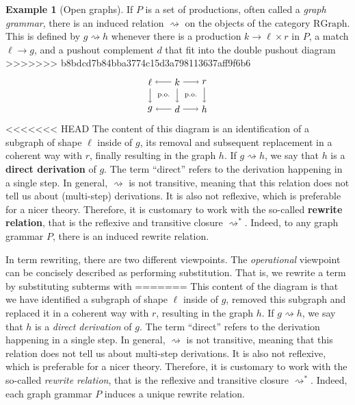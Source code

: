 \documentclass{amsart}
\newcommand{\RGraph}{\cat{RGraph}}
\newcommand{\defn}[1]{\textbf{#1}}
\newcommand{\cat}[1]{\mathrm{#1}}
\newcommand{\dderiv}[2]{#1 \rightsquigarrow #2}
\newcommand{\deriv}[2]{#1 \rightsquigarrow^\ast #2}
\newcommand{\squigto}{\rightsquigarrow}
\theoremstyle{remark}
\theoremstyle{definition}
\newtheorem{example}[theorem]{Example}
\begin{document}
\begin{example}[Open graphs]
If $ P $ is a set of productions, often called a \emph{graph grammar},
there is an induced relation $ \squigto $ on the objects of the category
$ \RGraph $. This is defined by $ g \squigto h $ whenever there is a
production $ k \to \ell \times r $ in $ P $, a match $ \ell \to g $,
and a pushout complement $ d $ that fit into the double pushout
diagram
>>>>>>> b8bdcd7b84bba3774c15d3a798113637aff9f6b6
%
\[
  \begin{tikzpicture}
    \node (1) at (0,1) {$ \ell $};
    \node (2) at (1,1) {$ k $};
    \node (3) at (2,1) {$ r $};
    \node (4) at (0,0) {$ g $};
    \node (5) at (1,0) {$ d $};
    \node (6) at (2,0) {$ h $};
    \draw [->] (2) to node [] {\scriptsize{$  $}} (1);
    \draw [->] (2) to node [] {\scriptsize{$  $}} (3);
    \draw [->] (5) to node [] {\scriptsize{$  $}} (4);
    \draw [->] (5) to node [] {\scriptsize{$  $}} (6);
    \draw [->] (1) to node [] {\scriptsize{$  $}} (4);
    \draw [->] (2) to node [] {\scriptsize{$  $}} (5);
    \draw [->] (3) to node [] {\scriptsize{$  $}} (6);
    \node () at (0.5,0.5) {\scriptsize{p.o.}};
    \node () at (1.5,0.5) {\scriptsize{p.o.}};
  \end{tikzpicture}
\]
%
<<<<<<< HEAD
The content of this diagram is an identification of a subgraph of
shape $ \ell $ inside of $ g $, its removal and subsequent replacement
in a coherent way with $ r $, finally resulting in the graph $ h $. If
$ \dderiv{g}{h} $, we say that $ h $ is a \defn{direct derivation} of
$ g $. The term ``direct'' refers to the derivation happening in a
single step.  In general, $ \dderiv{}{} $ is not transitive, meaning
that this relation does not tell us about (multi-step) derivations. It
is also not reflexive, which is preferable for a nicer theory.
Therefore, it is customary to work with the so-called \defn{rewrite
  relation}, that is the reflexive and transitive closure
$ \deriv{}{} $. Indeed, to any graph grammar $ P $, there is an
induced rewrite relation.

In term rewriting, there are two different viewpoints. The
\emph{operational} viewpoint can be concisely described as performing
substitution. That is, we rewrite a term by substituting subterms with
=======
This content of the diagram is that we have identified a subgraph of
shape $ \ell $ inside of $ g $, removed this subgraph and replaced it
in a coherent way with $ r $, resulting in the graph $ h $. If
$ g \squigto h $, we say that $ h $ is a \emph{direct derivation} of
$ g $. The term ``direct'' refers to the derivation happening in a
single step.  In general, $ \squigto $ is not transitive, meaning that
this relation does not tell us about multi-step derivations. It is
also not reflexive, which is preferable for a nicer theory.
Therefore, it is customary to work with the so-called \emph{rewrite
  relation}, that is the reflexive and transitive closure
$ \squigto^\ast $. Indeed, each graph grammar $ P $ induces a unique
rewrite relation.


\end{example}
\end{document}
